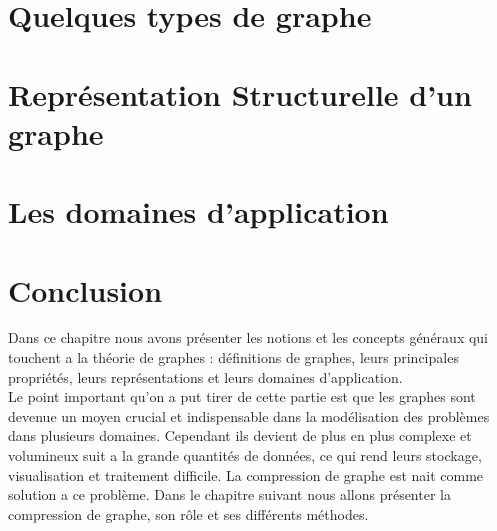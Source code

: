     	\section{Quelques types de graphe}
			
    		
    	\section{Représentation Structurelle d'un graphe}	
		
	
	\section{Les domaines d'application}
			
		
	
	
			
	\section{Conclusion}
Dans ce chapitre nous avons présenter les notions et les concepts généraux qui touchent a la théorie de graphes : définitions de graphes, leurs principales propriétés, leurs représentations et leurs domaines d'application.\\
Le point important qu'on a put tirer de cette partie est que les graphes sont devenue un moyen crucial et indispensable dans la modélisation des problèmes dans plusieurs domaines. Cependant ils devient de plus en plus complexe et volumineux suit a la grande quantités de données, ce qui rend leurs stockage, visualisation et traitement difficile. La compression de graphe est nait comme solution a ce problème. Dans le chapitre suivant nous allons présenter la compression de graphe, son rôle et ses différents méthodes.  
	
	